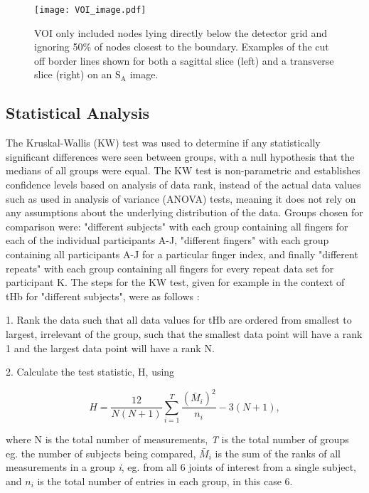 \documentclass[twoside]{bhamthesis}
\theoremstyle{definition}
\begin{document}
\begin{figure}[!ht]
\centering\texttt{[image: VOI\_image.pdf]}
\caption{VOI only included nodes lying directly below the detector grid and ignoring 50\% of nodes closest to the boundary. Examples of the cut off border lines shown for both a sagittal slice (left) and a transverse slice (right) on an $\mathrm{S_A}$ image.}
\label{VOI_image}
\end{figure}

\subsection{Statistical Analysis} 

The Kruskal-Wallis (KW) test was used to determine if any statistically significant differences were seen between groups, with a null hypothesis that the medians of all groups were equal. The KW test is non-parametric and establishes confidence levels based on analysis of data rank, instead of the actual data values such as used in analysis of variance (ANOVA) tests, meaning it does not rely on any assumptions about the underlying distribution of the data. Groups chosen for comparison were: "different subjects" with each group containing all fingers for each of the individual participants A-J,  "different fingers" with each group containing all participants A-J for a particular finger index, and finally "different repeats" with each group containing all fingers for every repeat data set for participant K. The steps for the KW test, given for example in the context of tHb for "different subjects", were as follows \cite{altman1990practical}:

1. Rank the data such that all data values for tHb are ordered from smallest to largest, irrelevant of the group, such that the smallest data point will have a rank 1 and the largest data point will have a rank N. 

2. Calculate the test statistic, H, using

\begin{equation}
 H =\frac{12}{N(N+1)} \sum_{i=1}^{T} \frac{(\bar{M}_i)^2}{n_i} - 3(N+1),
  \label{eqn:dark_noise}
\end{equation}

where N is the total number of measurements, \textit{T} is the total number of groups eg. the number of subjects being compared, $\bar{M}_i$ is the sum of the ranks of all measurements in a group \textit{i}, eg. from all 6 joints of interest from a single subject, and $n_i$ is the total number of entries in each group, in this case 6. 
\end{document}
